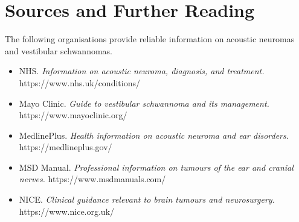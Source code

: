 \section*{Sources and Further Reading}
The following organisations provide reliable information on acoustic neuromas and vestibular schwannomas.

\begin{itemize}
    \item NHS. \textit{Information on acoustic neuroma, diagnosis, and treatment.} https://www.nhs.uk/conditions/
    \item Mayo Clinic. \textit{Guide to vestibular schwannoma and its management.} https://www.mayoclinic.org/
    \item MedlinePlus. \textit{Health information on acoustic neuroma and ear disorders.} https://medlineplus.gov/
    \item MSD Manual. \textit{Professional information on tumours of the ear and cranial nerves.} https://www.msdmanuals.com/
    \item NICE. \textit{Clinical guidance relevant to brain tumours and neurosurgery.} https://www.nice.org.uk/
\end{itemize}
